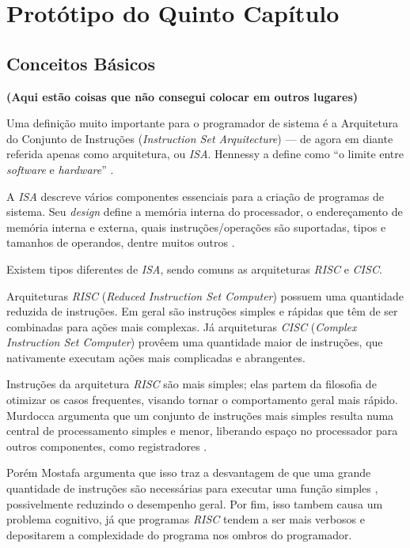 \chapter{Protótipo do Quinto Capítulo}

\section{Conceitos Básicos}

\textbf{(Aqui estão coisas que não consegui colocar em outros lugares)}


Uma definição muito importante para o programador de sistema é a Arquitetura do
Conjunto de Instruções (\textit{Instruction Set Arquitecture}) --- de agora em
diante referida apenas como arquitetura, ou \textit{ISA}. Hennessy a define como
``o limite entre \textit{software} e \textit{hardware}'' \cite{hennessy}.

A \textit{ISA} descreve vários componentes essenciais para a criação de
programas de sistema. Seu \textit{design} define a memória interna do
processador, o endereçamento de memória interna e externa, quais
instruções/operações são suportadas, tipos e tamanhos de operandos, dentre
muitos outros  \cite{patterson}.

Existem tipos diferentes de \textit{ISA}, sendo comuns as arquiteturas
\textit{RISC} e \textit{CISC}.

Arquiteturas \textit{RISC} (\textit{Reduced Instruction Set Computer}) possuem
uma quantidade reduzida de instruções. Em geral são instruções simples e rápidas
que têm de ser combinadas para ações mais complexas. Já arquiteturas
\textit{CISC} (\textit{Complex Instruction Set Computer}) provêem uma quantidade
maior de instruções, que nativamente executam ações mais complicadas e
abrangentes.

Instruções da arquitetura \textit{RISC} são mais simples; elas partem da
filosofia de otimizar os casos frequentes, visando tornar o comportamento geral
mais rápido. Murdocca argumenta que um conjunto de instruções mais simples
resulta numa central de processamento simples e menor, liberando espaço no
processador para outros componentes, como registradores \cite{principles}.

Porém Mostafa argumenta que isso traz a desvantagem de que uma grande quantidade
de instruções são necessárias para executar uma função simples \cite{mostafa},
possivelmente reduzindo o desempenho geral. Por fim, isso tambem causa um
problema cognitivo, já que programas \textit{RISC} tendem a ser mais verbosos e
depositarem a complexidade do programa nos ombros do programador.

